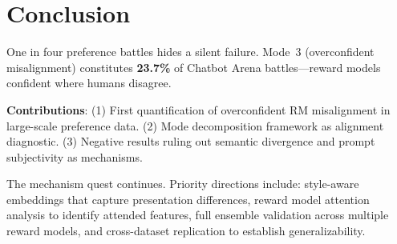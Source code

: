 \section{Conclusion}

One in four preference battles hides a silent failure. Mode~3 (overconfident misalignment) constitutes \textbf{23.7\%} of Chatbot Arena battles---reward models confident where humans disagree.

\textbf{Contributions}: (1) First quantification of overconfident RM misalignment in large-scale preference data. (2) Mode decomposition framework as alignment diagnostic. (3) Negative results ruling out semantic divergence and prompt subjectivity as mechanisms.

The mechanism quest continues. Priority directions include: style-aware embeddings that capture presentation differences, reward model attention analysis to identify attended features, full ensemble validation across multiple reward models, and cross-dataset replication to establish generalizability.
